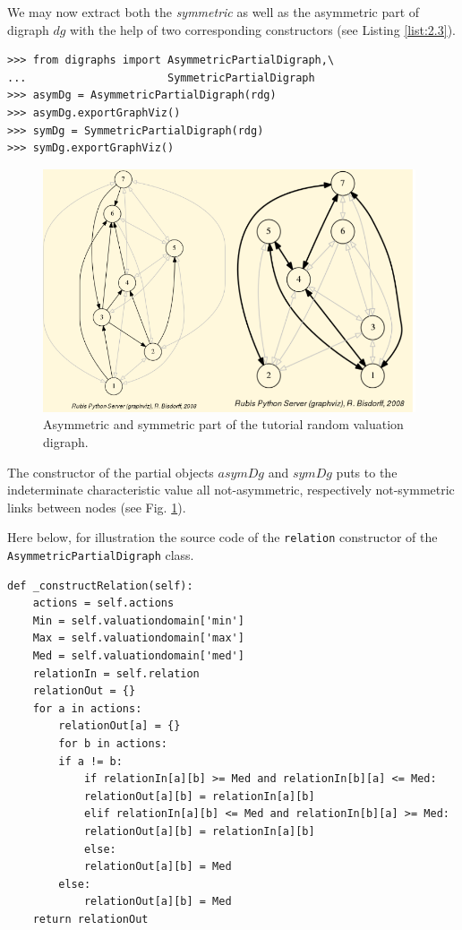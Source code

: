 We may now extract both the \emph{}\emph{symmetric} as well as the asymmetric part of digraph $dg$ with the help of two corresponding constructors (see Listing \ref{list:2.3}).
\begin{lstlisting}[caption={Computing asymmetric and symmetric Parts},label=list:2.3]
>>> from digraphs import AsymmetricPartialDigraph,\
...                      SymmetricPartialDigraph
>>> asymDg = AsymmetricPartialDigraph(rdg)
>>> asymDg.exportGraphViz()
>>> symDg = SymmetricPartialDigraph(rdg)
>>> symDg.exportGraphViz()
\end{lstlisting}
\begin{figure}[h]
\includegraphics[width=11cm]{Figures/asymSymParts.png}
\caption{Asymmetric and symmetric part of the tutorial random valuation digraph.}
\label{fig:2.2}       %
\end{figure}
The constructor of the partial objects $asymDg$ and $symDg$ puts to the indeterminate characteristic value all not-asymmetric, respectively not-symmetric links between nodes (see Fig. \ref{fig:2.2}).

Here below, for illustration the source code of the {\tt relation} constructor of the {\tt AsymmetricPartialDigraph} class.
\begin{lstlisting}[label=list:2.4,basicstyle=\footnotesize]
    def _constructRelation(self):
	actions = self.actions
	Min = self.valuationdomain['min']
	Max = self.valuationdomain['max']
	Med = self.valuationdomain['med']
	relationIn = self.relation
	relationOut = {}
	for a in actions:
	    relationOut[a] = {}
	    for b in actions:
		if a != b:
		    if relationIn[a][b] >= Med and relationIn[b][a] <= Med:
			relationOut[a][b] = relationIn[a][b]
		    elif relationIn[a][b] <= Med and relationIn[b][a] >= Med:
			relationOut[a][b] = relationIn[a][b]
		    else:
			relationOut[a][b] = Med
		else:
		    relationOut[a][b] = Med
	return relationOut
\end{lstlisting}

